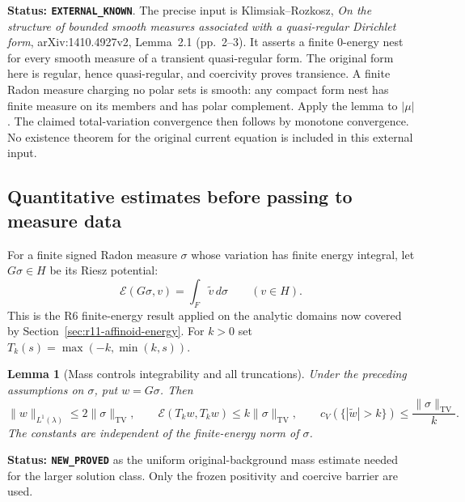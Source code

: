 \documentclass[11pt,a4paper]{article}
\numberwithin{equation}{section}
\newtheorem{lemma}[theorem]{Lemma}
\theoremstyle{definition}
\theoremstyle{remark}
\begin{document}
\noindent\textbf{Status: \texttt{EXTERNAL\_KNOWN}}.
The precise input is Klimsiak--Rozkosz,
\emph{On the structure of bounded smooth measures associated with a
quasi-regular Dirichlet form}, arXiv:1410.4927v2,
Lemma~2.1 (pp.~2--3).  It asserts a finite $0$-energy nest
for every smooth measure of a transient quasi-regular form.
The original form here is regular, hence quasi-regular, and
coercivity proves transience.  A finite Radon measure charging
no polar sets is smooth: any compact form nest has finite
measure on its members and has polar complement.  Apply the
lemma to $|\mu|$.  The claimed total-variation convergence
then follows by monotone convergence.
No existence theorem for the original current equation is
included in this external input.

\subsection{Quantitative estimates before passing to measure data}

For a finite signed Radon measure $\sigma$ whose variation has
finite energy integral, let $G\sigma\in H$ be its Riesz potential:
\[
               \mathcal E(G\sigma,v)=\int_F\widetilde v\,d\sigma
                                 \qquad(v\in H).
 \tag{MD4}
\]
This is the R6 finite-energy result applied on the analytic
domains now covered by Section~\ref{sec:r11-affinoid-energy}.
For $k>0$ set $T_k(s)=\max(-k,\min(k,s))$.

\begin{lemma}[Mass controls integrability and all truncations]
\label{lem:r11-finite-energy-mass-estimates}
Under the preceding assumptions on $\sigma$, put $w=G\sigma$.
Then
\[
 \|w\|_{L^1(\lambda)}\leq2\|\sigma\|_{\mathrm{TV}},\qquad
 \mathcal E(T_k w,T_k w)\leq k\|\sigma\|_{\mathrm{TV}},\qquad
 c_V(\{|\widetilde w|>k\})\leq\frac{\|\sigma\|_{\mathrm{TV}}}{k}.
 \tag{MD5}
\]
The constants are independent of the finite-energy norm of $\sigma$.
\end{lemma}

\noindent\textbf{Status: \texttt{NEW\_PROVED}} as the uniform
original-background mass estimate needed for the larger solution class.
Only the frozen positivity and coercive barrier are used.
\end{document}
